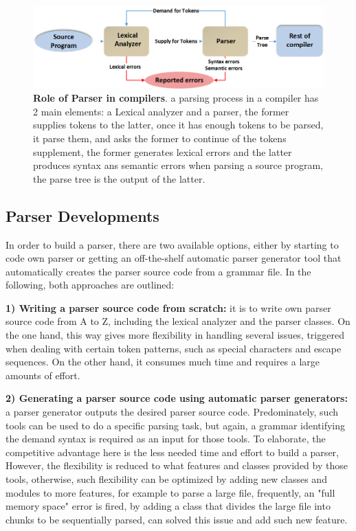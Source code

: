 \begin{figure}[ht]
	\begin{center}	\setlength\belowcaptionskip{-5mm}
	\includegraphics[scale=0.55,angle=0]{images/ParserRole}
	\caption{\textbf{Role of Parser in compilers}. a parsing process in a compiler has 2 main elements: a Lexical analyzer and a parser, the former supplies tokens to the latter, once it has enough tokens to be parsed, it parse them, and asks the former to continue of the tokens supplement, the former generates lexical errors and the latter produces syntax ans semantic errors when parsing a source program, the parse tree is the output of the latter.}
		\label{Fig:parserPosition}
	\end{center}
\end{figure}
\subsection{Parser Developments}
In order to build a parser, there are two available options, either by starting  to code own parser  or getting an off-the-shelf automatic parser generator tool that automatically creates the parser source code from a grammar file. In the following, both approaches are outlined:

\textbf{1) Writing a parser source code from scratch:} it is to write own parser source code from A to Z, including the lexical analyzer and the parser classes. On the one hand, this way gives more flexibility in handling several issues, triggered when dealing with certain token patterns, such as special characters and escape sequences. On the other hand, it consumes much time and requires a large amounts of  effort.

\textbf{2) Generating a parser source code using automatic parser generators:} a parser generator outputs the desired parser source code. Predominately, such tools can be used to do a specific parsing task, but again, a grammar identifying the  demand syntax is required as an input for those tools. To elaborate, the competitive advantage here is the less needed time and effort to build a parser, However, the flexibility is reduced to what features and classes provided by those tools, otherwise, such flexibility can be  optimized by adding new classes and modules to more features, for example to parse a large file, frequently, an "full memory space" error is fired, by adding a class that divides the large file into chunks to be sequentially parsed, can solved this issue and add such new feature.  

